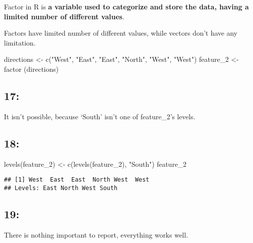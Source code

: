 \documentclass[
]{article}
\newenvironment{Shaded}{\begin{snugshade}}{\end{snugshade}}
\newcommand{\FunctionTok}[1]{\textcolor[rgb]{0.00,0.00,0.00}{#1}}
\newcommand{\NormalTok}[1]{#1}
\newcommand{\OtherTok}[1]{\textcolor[rgb]{0.56,0.35,0.01}{#1}}
\newcommand{\StringTok}[1]{\textcolor[rgb]{0.31,0.60,0.02}{#1}}
\begin{document}
Factor in R is \textbf{a variable used to categorize and store the data,
having a limited number of different values}.

Factors have limited number of different values, while vectors don't
have any limitation.

\begin{Shaded}
\begin{Highlighting}[]
\NormalTok{directions }\OtherTok{\textless{}{-}} \FunctionTok{c}\NormalTok{(}\StringTok{"West"}\NormalTok{, }\StringTok{"East"}\NormalTok{, }\StringTok{"East"}\NormalTok{, }\StringTok{"North"}\NormalTok{, }\StringTok{"West"}\NormalTok{, }\StringTok{"West"}\NormalTok{)}
\NormalTok{feature\_2 }\OtherTok{\textless{}{-}} \FunctionTok{factor}\NormalTok{ (directions)}
\end{Highlighting}
\end{Shaded}

\hypertarget{section-16}{%
\subsection{17:}\label{section-16}}

It isn't possible, because `South' isn't one of feature\_2's levels.

\hypertarget{section-17}{%
\subsection{18:}\label{section-17}}

\begin{Shaded}
\begin{Highlighting}[]
\FunctionTok{levels}\NormalTok{(feature\_2) }\OtherTok{\textless{}{-}} \FunctionTok{c}\NormalTok{(}\FunctionTok{levels}\NormalTok{(feature\_2), }\StringTok{"South"}\NormalTok{)}
\NormalTok{feature\_2}
\end{Highlighting}
\end{Shaded}

\begin{verbatim}
## [1] West  East  East  North West  West 
## Levels: East North West South
\end{verbatim}

\hypertarget{section-18}{%
\subsection{19:}\label{section-18}}

There is nothing important to report, everything works well.
\end{document}
